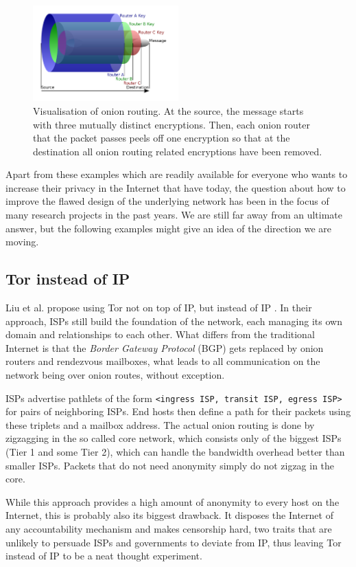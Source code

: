 \documentclass{acm_proc_article-sp}
\begin{document}
\begin{figure}[h]
  \includegraphics[width=0.5\textwidth]{images/tor.png}
  \caption{Visualisation of onion routing. At the source, the message starts with three mutually distinct encryptions. Then, each onion router that the packet passes peels off one encryption so that at the destination all onion routing related encryptions have been removed. \cite{tor-dia}}
  \label{fig:tor}
\end{figure}
Apart from these examples which are readily available for everyone who wants to increase their privacy in the Internet that have today, the question about how to improve the flawed design of the underlying network has been in the focus of many research projects in the past years. We are still far away from an ultimate answer, but the following examples might give an idea of the direction we are moving.
\subsection{Tor instead of IP}
Liu et al. propose using Tor not on top of IP, but instead of IP \cite{tor}. In their approach, ISPs still build the foundation of the network, each managing its own domain and relationships to each other. What differs from the traditional Internet is that the \emph{Border Gateway Protocol} (BGP) gets replaced by onion routers and rendezvous mailboxes, what leads to all communication on the network being over onion routes, without exception.

ISPs advertise pathlets \cite{pathlet} of the form \texttt{<ingress ISP, transit ISP, egress ISP>} for pairs of neighboring ISPs. End hosts then define a path for their packets using these triplets and a mailbox address. The actual onion routing is done by zigzagging in the so called core network, which consists only of the biggest ISPs (Tier 1 and some Tier 2), which can handle the bandwidth overhead better than smaller ISPs. Packets that do not need anonymity simply do not zigzag in the core.

While this approach provides a high amount of anonymity to every host on the Internet, this is probably also its biggest drawback. It disposes the Internet of any accountability mechanism and makes censorship hard, two traits that are unlikely to persuade ISPs and governments to deviate from IP, thus leaving Tor instead of IP to be a neat thought experiment.
\end{document}

